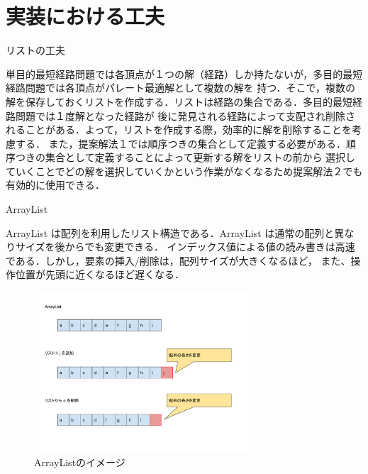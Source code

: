 \documentclass[12pt]{optlab-bachelor}
\begin{document}
\section{実装における工夫}

\begin{description}
  \item[リストの工夫]
\end{description}

単目的最短経路問題では各頂点が１つの解（経路）しか持たないが，多目的最短経路問題では各頂点がパレート最適解として複数の解を
持つ．そこで，複数の解を保存しておくリストを作成する．リストは経路の集合である．多目的最短経路問題では１度解となった経路が
後に発見される経路によって支配され削除されることがある．よって，リストを作成する際，効率的に解を削除することを考慮する．
また，提案解法１では順序つきの集合として定義する必要がある．順序つきの集合として定義することによって更新する解をリストの前から
選択していくことでどの解を選択していくかという作業がなくなるため提案解法２でも有効的に使用できる．

\begin{description}
  \item[ArrayList]
\end{description}

ArrayList は配列を利用したリスト構造である．ArrayList は通常の配列と異なりサイズを後からでも変更できる．
インデックス値による値の読み書きは高速である．しかし，要素の挿入/削除は，配列サイズが大きくなるほど，
また、操作位置が先頭に近くなるほど遅くなる．

\begin{figure}[htbp]
  \centering
  \caption{ArrayListのイメージ}
  \includegraphics[height=6.0cm, width=8.0cm]{fig/fig9.pdf}
\end{figure}
\end{document}
